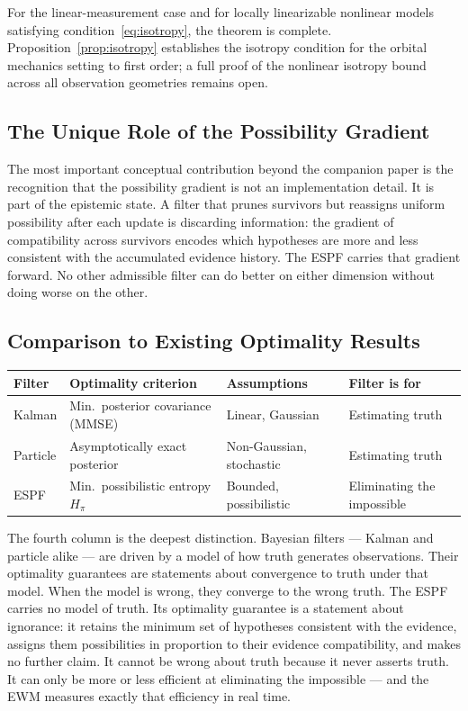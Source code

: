 \documentclass[12pt]{article}
\begin{document}
For the linear-measurement case and for locally linearizable nonlinear models satisfying condition~\eqref{eq:isotropy}, the theorem is complete. Proposition~\ref{prop:isotropy} establishes the isotropy condition for the orbital mechanics setting to first order; a full proof of the nonlinear isotropy bound across all observation geometries remains open.

\subsection{The Unique Role of the Possibility Gradient}

The most important conceptual contribution beyond the companion paper \cite{espf} is the recognition that the possibility gradient is not an implementation detail. It is part of the epistemic state. A filter that prunes survivors but reassigns uniform possibility after each update is discarding information: the gradient of compatibility across survivors encodes which hypotheses are more and less consistent with the accumulated evidence history. The ESPF carries that gradient forward. No other admissible filter can do better on either dimension without doing worse on the other.

\subsection{Comparison to Existing Optimality Results}
\label{sec:comparison}

\begin{center}
\begin{tabular}{llll}
\toprule
Filter & Optimality criterion & Assumptions & Filter is for \\
\midrule
Kalman & Min.\ posterior covariance (MMSE) & Linear, Gaussian & Estimating truth \\
Particle & Asymptotically exact posterior & Non-Gaussian, stochastic & Estimating truth \\
ESPF & Min.\ possibilistic entropy $H_\pi$ & Bounded, possibilistic & Eliminating the impossible \\
\bottomrule
\end{tabular}
\end{center}

The fourth column is the deepest distinction. Bayesian filters --- Kalman and particle alike ---
are driven by a model of how truth generates observations. Their optimality guarantees are
statements about convergence to truth under that model. When the model is wrong, they converge
to the wrong truth. The ESPF carries no model of truth. Its optimality guarantee is a statement
about ignorance: it retains the minimum set of hypotheses consistent with the evidence, assigns
them possibilities in proportion to their evidence compatibility, and makes no further claim. It
cannot be wrong about truth because it never asserts truth. It can only be more or less efficient
at eliminating the impossible --- and the EWM measures exactly that efficiency in real time.
\end{document}
